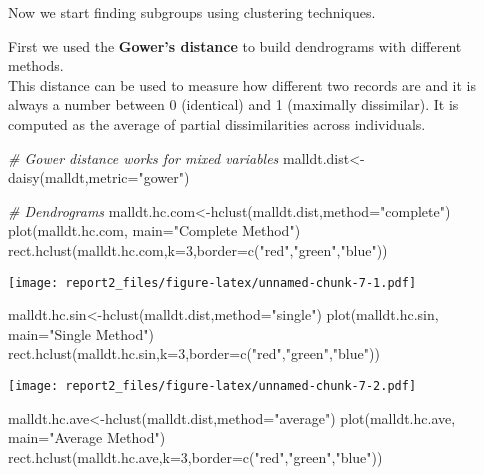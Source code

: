 \documentclass[
]{article}
\newenvironment{Shaded}{\begin{snugshade}}{\end{snugshade}}
\newcommand{\AttributeTok}[1]{\textcolor[rgb]{0.77,0.63,0.00}{#1}}
\newcommand{\CommentTok}[1]{\textcolor[rgb]{0.56,0.35,0.01}{\textit{#1}}}
\newcommand{\DecValTok}[1]{\textcolor[rgb]{0.00,0.00,0.81}{#1}}
\newcommand{\FunctionTok}[1]{\textcolor[rgb]{0.00,0.00,0.00}{#1}}
\newcommand{\NormalTok}[1]{#1}
\newcommand{\OtherTok}[1]{\textcolor[rgb]{0.56,0.35,0.01}{#1}}
\newcommand{\StringTok}[1]{\textcolor[rgb]{0.31,0.60,0.02}{#1}}
\begin{document}
Now we start finding subgroups using clustering techniques.

First we used the \textbf{Gower's distance} to build dendrograms with
different methods.\\
This distance can be used to measure how different two records are and
it is always a number between 0 (identical) and 1 (maximally
dissimilar). It is computed as the average of partial dissimilarities
across individuals.

\begin{Shaded}
\begin{Highlighting}[]
\CommentTok{\# Gower distance works for mixed variables}
\NormalTok{malldt.dist}\OtherTok{\textless{}{-}}\FunctionTok{daisy}\NormalTok{(malldt,}\AttributeTok{metric=}\StringTok{"gower"}\NormalTok{)}

\CommentTok{\# Dendrograms}
\NormalTok{malldt.hc.com}\OtherTok{\textless{}{-}}\FunctionTok{hclust}\NormalTok{(malldt.dist,}\AttributeTok{method=}\StringTok{"complete"}\NormalTok{) }
\FunctionTok{plot}\NormalTok{(malldt.hc.com, }\AttributeTok{main=}\StringTok{"Complete Method"}\NormalTok{) }
\FunctionTok{rect.hclust}\NormalTok{(malldt.hc.com,}\AttributeTok{k=}\DecValTok{3}\NormalTok{,}\AttributeTok{border=}\FunctionTok{c}\NormalTok{(}\StringTok{"red"}\NormalTok{,}\StringTok{"green"}\NormalTok{,}\StringTok{"blue"}\NormalTok{)) }
\end{Highlighting}
\end{Shaded}

\texttt{[image: report2\_files/figure-latex/unnamed-chunk-7-1.pdf]}

\begin{Shaded}
\begin{Highlighting}[]
\NormalTok{malldt.hc.sin}\OtherTok{\textless{}{-}}\FunctionTok{hclust}\NormalTok{(malldt.dist,}\AttributeTok{method=}\StringTok{"single"}\NormalTok{) }
\FunctionTok{plot}\NormalTok{(malldt.hc.sin, }\AttributeTok{main=}\StringTok{"Single Method"}\NormalTok{) }
\FunctionTok{rect.hclust}\NormalTok{(malldt.hc.sin,}\AttributeTok{k=}\DecValTok{3}\NormalTok{,}\AttributeTok{border=}\FunctionTok{c}\NormalTok{(}\StringTok{"red"}\NormalTok{,}\StringTok{"green"}\NormalTok{,}\StringTok{"blue"}\NormalTok{)) }
\end{Highlighting}
\end{Shaded}

\texttt{[image: report2\_files/figure-latex/unnamed-chunk-7-2.pdf]}

\begin{Shaded}
\begin{Highlighting}[]
\NormalTok{malldt.hc.ave}\OtherTok{\textless{}{-}}\FunctionTok{hclust}\NormalTok{(malldt.dist,}\AttributeTok{method=}\StringTok{"average"}\NormalTok{) }
\FunctionTok{plot}\NormalTok{(malldt.hc.ave, }\AttributeTok{main=}\StringTok{"Average Method"}\NormalTok{) }
\FunctionTok{rect.hclust}\NormalTok{(malldt.hc.ave,}\AttributeTok{k=}\DecValTok{3}\NormalTok{,}\AttributeTok{border=}\FunctionTok{c}\NormalTok{(}\StringTok{"red"}\NormalTok{,}\StringTok{"green"}\NormalTok{,}\StringTok{"blue"}\NormalTok{)) }
\end{Highlighting}
\end{Shaded}
\end{document}
